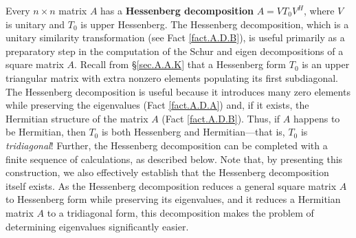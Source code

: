 Every $n\times n$ matrix $A$ has a {\bf Hessenberg decomposition} $A=V
T_0 V^{H}$, where $V$ is unitary and $T_0$ is upper Hessenberg.  The
Hessenberg decomposition, which is a unitary similarity transformation (see Fact \ref{fact.A.D.B}), is useful primarily as a preparatory
step in the computation of the Schur and eigen decompositions of
a square matrix $A$.  Recall from \S \ref{sec.A.A.K} that a
Hessenberg form $T_0$ is an upper triangular matrix with extra
nonzero elements populating its first subdiagonal.  The Hessenberg
decomposition is useful because it introduces many zero elements while
preserving the eigenvalues (Fact \ref{fact.A.D.A}) and, if it exists,
the Hermitian structure of the matrix $A$ (Fact \ref{fact.A.D.B}).
Thus, if $A$ happens to be Hermitian, then $T_0$ is both Hessenberg
and Hermitian---that is, $T_0$ is {\it tridiagonal\/}!  Further, the
Hessenberg decomposition can be completed with a finite
sequence of calculations, as described below.  Note that, by
presenting this construction, we also effectively establish that the
Hessenberg decomposition itself exists.  As the Hessenberg
decomposition reduces a general square matrix $A$ to Hessenberg form while preserving its eigenvalues, and it reduces a Hermitian
matrix $A$ to a tridiagonal form, this decomposition makes the problem of determining eigenvalues significantly easier.

\begin{figure*}[t]
\end{figure*}

